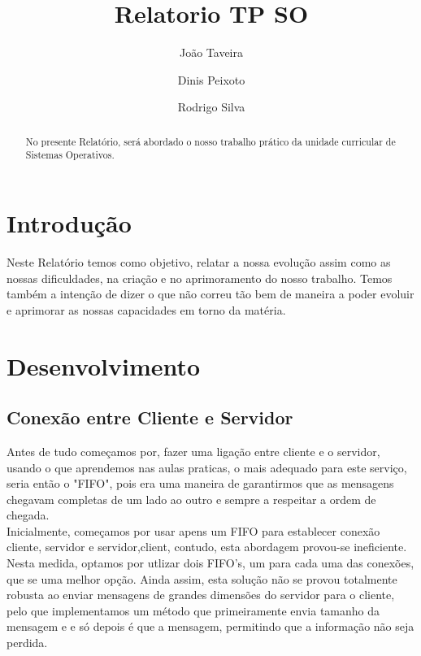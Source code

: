 \documentclass{llncs}
\begin{document}
\mainmatter
\title{Relatorio TP SO}


\author{João Taveira \and Dinis Peixoto \and Rodrigo Silva}



\date{}


\maketitle
\begin{abstract}
No presente Relatório, será abordado o nosso trabalho prático da unidade curricular de Sistemas Operativos.
\end{abstract}

\section{Introdução}
Neste Relatório temos como objetivo, relatar a nossa evolução assim como as nossas dificuldades, na criação e no aprimoramento do nosso trabalho.
Temos também a intenção de dizer o que não correu tão bem de maneira a poder evoluir e aprimorar as nossas capacidades em torno da matéria. 

\section{Desenvolvimento}

\subsection{Conexão entre Cliente e Servidor}
Antes de tudo começamos por, fazer uma ligação entre cliente e o servidor, usando o que aprendemos nas aulas praticas, o mais adequado para este serviço, 
seria então o "FIFO", pois era uma maneira de garantirmos que as mensagens chegavam completas de um lado ao outro e sempre a respeitar a ordem de chegada.\\

Inicialmente, começamos por usar apens um FIFO para establecer conexão cliente, servidor e servidor,client, contudo, esta abordagem provou-se ineficiente. Nesta medida,
optamos por utlizar dois FIFO's, um para cada uma das conexões, que se uma melhor opção. Ainda assim, esta solução não se provou totalmente robusta ao enviar mensagens 
de grandes dimensões do servidor para o cliente, pelo que implementamos um método que primeiramente envia tamanho da mensagem e e só depois é que a mensagem, permitindo que 
a informação não seja perdida.
\end{document}
